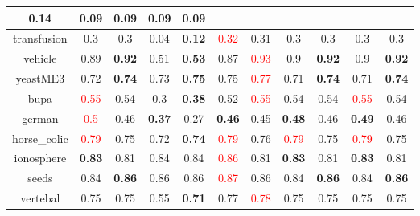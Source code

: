 \documentclass{article}%
\begin{document}
\begin{tabular}{c|cccccccccc}
{0.14
}&0.09&0.09&0.09&0.09\\%
\hline%
transfusion&0.3&0.3&0.04&\textbf{0.12}&\textcolor{red}{ 
0.32
}&0.31&0.3&0.3&0.3&0.3\\%
\hline%
vehicle&0.89&\textbf{0.92}&0.51&\textbf{0.53}&0.87&\textcolor{red}{ 
0.93
}&0.9&\textbf{0.92}&0.9&\textbf{0.92}\\%
\hline%
yeastME3&0.72&\textbf{0.74}&0.73&\textbf{0.75}&0.75&\textcolor{red}{ 
0.77
}&0.71&\textbf{0.74}&0.71&\textbf{0.74}\\%
\hline%
bupa&\textcolor{red}{ 
0.55
}&0.54&0.3&\textbf{0.38}&0.52&\textcolor{red}{ 
0.55
}&0.54&0.54&\textcolor{red}{ 
0.55
}&0.54\\%
\hline%
german&\textcolor{red}{ 
0.5
}&0.46&\textbf{0.37}&0.27&\textbf{0.46}&0.45&\textbf{0.48}&0.46&\textbf{0.49}&0.46\\%
\hline%
horse\_colic&\textcolor{red}{ 
0.79
}&0.75&0.72&\textbf{0.74}&\textcolor{red}{ 
0.79
}&0.76&\textcolor{red}{ 
0.79
}&0.75&\textcolor{red}{ 
0.79
}&0.75\\%
\hline%
ionosphere&\textbf{0.83}&0.81&0.84&0.84&\textcolor{red}{ 
0.86
}&0.81&\textbf{0.83}&0.81&\textbf{0.83}&0.81\\%
\hline%
seeds&0.84&\textbf{0.86}&0.86&0.86&\textcolor{red}{ 
0.87
}&0.86&0.84&\textbf{0.86}&0.84&\textbf{0.86}\\%
\hline%
vertebal&0.75&0.75&0.55&\textbf{0.71}&0.77&\textcolor{red}{ 
0.78
}&0.75&0.75&0.75&0.75\\%
\hline%
\end{tabular}

%
\end{document}

